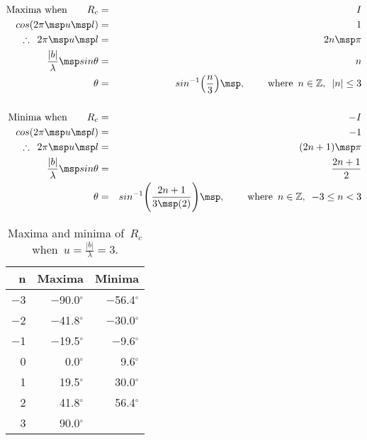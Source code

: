 \begin{eqnarray}
  \label{eq:8}
            \mbox{Maxima when} \qquad R_c &=& I           \nonumber \\
                  cos(2\pi \msp u \msp l) &=& 1           \nonumber \\
  \therefore \enspace 2\pi \msp u \msp l  &=& 2n \msp \pi \nonumber \\
       \frac{|b|}{\lambda} \msp sin\theta &=& n           \nonumber \\
                                   \theta &=& sin^{-1}\Big(\frac{n}{3}\Big) \msp , \hspace{0.8cm} \mbox{where} \enspace n \in \mathbb{Z}, \enspace |n| \leq 3 \nonumber \\
                                                 \nonumber \\
            \mbox{Minima when} \qquad R_c &=& -I \nonumber \\
                  cos(2\pi \msp u \msp l) &=& -1 \nonumber \\
   \therefore \enspace 2\pi \msp u \msp l &=& (2n+1) \msp \pi \nonumber \\
       \frac{|b|}{\lambda} \msp sin\theta &=& \frac{2n+1}{2} \nonumber \\
                                   \theta &=& sin^{-1}\Bigg(\frac{2n+1}{3 \msp (2)}\Bigg) \msp , \hspace{0.8cm} \mbox{where} \enspace n \in \mathbb{Z}, \enspace -3 \leq n < 3 \nonumber
\end{eqnarray}

\begin{table}
  \centering
\begin{tabular}{rrr}
  n & Maxima         & Minima         \\
  \hline
  $-$3 & $-$90.0$^\circ$ & $-$56.4$^\circ$ \\
  $-$2 & $-$41.8$^\circ$ & $-$30.0$^\circ$ \\
  $-$1 & $-$19.5$^\circ$ &  $-$9.6$^\circ$ \\
     0 &     0.0$^\circ$ &     9.6$^\circ$ \\
     1 &    19.5$^\circ$ &    30.0$^\circ$ \\
     2 &    41.8$^\circ$ &    56.4$^\circ$ \\
     3 &    90.0$^\circ$ &                \\
  \hline
\end{tabular}
\caption[]{Maxima and minima of~$R_c$ when~$u = \frac{|b|}{\lambda} = 3$.}
\label{tab:max-min}
\end{table}

